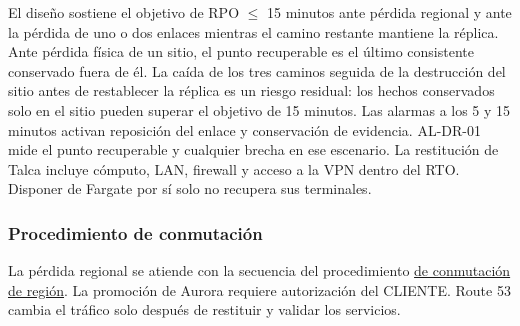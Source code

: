 El diseño sostiene el objetivo de RPO $\leq$ 15 minutos ante pérdida regional y ante la pérdida de uno o dos enlaces mientras el camino restante mantiene la réplica. Ante pérdida física de un sitio, el punto recuperable es el último consistente conservado fuera de él. La caída de los tres caminos seguida de la destrucción del sitio antes de restablecer la réplica es un riesgo residual: los hechos conservados solo en el sitio pueden superar el objetivo de 15 minutos. Las alarmas a los 5 y 15 minutos activan reposición del enlace y conservación de evidencia. AL-DR-01 mide el punto recuperable y cualquier brecha en ese escenario. La restitución de Talca incluye cómputo, LAN, firewall y acceso a la VPN dentro del RTO. Disponer de Fargate por sí solo no recupera sus terminales.

\subsubsection{Procedimiento de conmutación}
\label{sub:conmutacion-regional}

La pérdida regional se atiende con la secuencia del procedimiento \hyperref[tab:4-3-6]{de conmutación de región}. La promoción de Aurora requiere autorización del CLIENTE. Route 53 cambia el tráfico solo después de restituir y validar los servicios.

